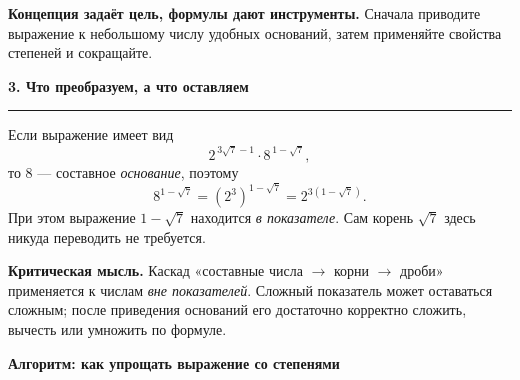 \documentclass[a4paper,12pt]{article}
\newcommand{\topic}[1]{%
  \vspace{0.6em}
  {\large\bfseries\color{darkaccent}#1}\par
  \vspace{0.15em}\color{linegray}\hrule\color{textgray}\vspace{0.35em}
}
\newcommand{\keyidea}[1]{\textbf{\color{darkaccent}#1}}
\begin{document}
\keyidea{Концепция задаёт цель, формулы дают инструменты.} Сначала приводите выражение к небольшому числу удобных оснований, затем применяйте свойства степеней и сокращайте.

\topic{3. Что преобразуем, а что оставляем}

Если выражение имеет вид
\[
2^{\,3\sqrt7-1}\cdot 8^{\,1-\sqrt7},
\]
то \(8\) --- составное \emph{основание}, поэтому
\[
8^{1-\sqrt7}=(2^3)^{1-\sqrt7}=2^{3(1-\sqrt7)}.
\]
При этом выражение \(1-\sqrt7\) находится \emph{в показателе}. Сам корень \(\sqrt7\) здесь никуда переводить не требуется.

\keyidea{Критическая мысль.} Каскад «составные числа \(\to\) корни \(\to\) дроби» применяется к числам \emph{вне показателей}. Сложный показатель может оставаться сложным; после приведения оснований его достаточно корректно сложить, вычесть или умножить по формуле.

\clearpage

\thispagestyle{plain}
\begin{center}
{\Large\bfseries\color{darkaccent}Алгоритм: как упрощать выражение со степенями}
\end{center}
\vspace{5mm}
\end{document}
